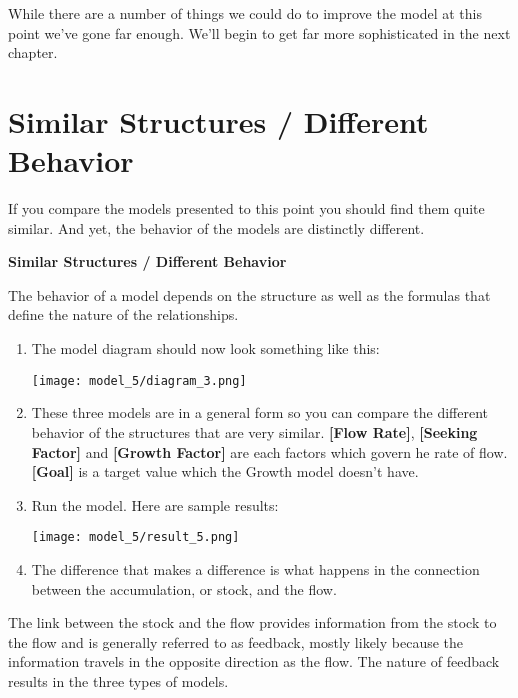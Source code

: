 \documentclass[]{memoir}
\makeatletter
\def\maxwidth{\ifdim\Gin@nat@width>\linewidth\linewidth
\else\Gin@nat@width\fi}
\let\Oldincludegraphics\includegraphics
\renewcommand{\includegraphics}[1]{\Oldincludegraphics[width=\maxwidth]{#1}}
\newcommand{\p}[1]{\textbf{{[}#1{]}}}
\makeatother
\begin{document}
While there are a number of things we could do to improve the model at
this point we've gone far enough. We'll begin to get far more
sophisticated in the next chapter.

\section{Similar Structures / Different Behavior}

If you compare the models presented to this point you should find them
quite similar. And yet, the behavior of the models are distinctly
different.

\FloatBarrier 

\begin{oframed}\textbf{Similar Structures / Different Behavior} 

 The behavior of a model depends on the structure as well as the formulas that define the nature of the relationships.

\begin{enumerate}
\item The model diagram should now look something like this: \par \begin{minipage}{\linewidth}  \centering \texttt{[image: model\_5/diagram\_3.png]}
\end{minipage}
\item 

These three models are in a general form so you can compare the different behavior of the structures that are very similar. \p{Flow Rate}, \p{Seeking Factor} and \p{Growth Factor} are each factors which govern he rate of flow. \p{Goal} is a target value which the Growth model doesn't have.


\item Run the model. Here are sample results:\par \begin{minipage}{\linewidth}  \centering \texttt{[image: model\_5/result\_5.png]}
\end{minipage}
\item 

The difference that makes a difference is what happens in the connection between the accumulation, or stock, and the flow.



\end{enumerate} \end{oframed}

The link between the stock and the flow provides information from the
stock to the flow and is generally referred to as feedback, mostly
likely because the information travels in the opposite direction as the
flow. The nature of feedback results in the three types of models.
\end{document}
